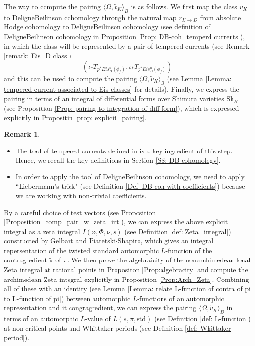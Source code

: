 \documentclass[11pt, a4paper]{amsart}
\theoremstyle{plain}
\theoremstyle{definition}
\newtheorem{remark}[theorem]{Remark}
\numberwithin{equation}{section}
\newcommand{\Sh}{\mathrm{Sh}}
\begin{document}
\par The way to compute the pairing $\langle \Omega, \tilde{v}_{K} \rangle_{B}$ is as follows. We first map the class $v_{K}$ to Deligne{\textendash}Beilinson cohomology through the natural map $r_{H \rightarrow D}$ from absolute Hodge cohomology to Deligne{\textendash}Beilinson cohomology (see definition of Deligne{\textendash}Beilinson cohomology in Proposition \ref{Prop: DB-coh_temperd currents}), in which the class will be represented by a pair of tempered currents (see Remark \ref{remark: Eis_D class})
\begin{equation*}
    (\iota_{*}T_{p^{*}Eis_{H}^{n}(\phi_f)}, \iota_{*} T_{p^{*}Eis_{B}^{n}(\phi_f)})
\end{equation*}
and this can be used to compute the pairing $\langle \Omega, \tilde{v}_{K} \rangle_{B}$ (see Lemma \ref{Lemma: tempered current associated to Eis classes} for details). Finally, we express the pairing in terms of an integral of differential forms over Shimura varieties $\Sh_{H}$ (see Proposition \ref{Prop: pairing to integration of diff form}), which is expressed explicitly in Propositin \ref{prop: explicit_pairing}. 

\begin{remark}
    \begin{itemize}
        \item The tool of tempered currents defined in \cite{BCLRJ24} is a key ingredient of this step. Hence, we recall the key definitions in Section \ref{SS: DB cohomology}. 
        \item In order to apply the tool of Deligne{\textendash}Beilinson cohomology, we need to apply ``Liebermann’s trick" (see Definition \ref{Def: DB-coh with coefficients}) because we are working with non-trivial coefficients. 
    \end{itemize}
\end{remark}

\par By a careful choice of test vectors (see Proposition \ref{Proposition_comp_pair_w_zeta_int}), we can express the above explicit integral as a zeta integral $I(\varphi, \Phi, \nu, s)$ (see Definition \ref{def: Zeta_integral}) constructed by Gelbart and Piatetski-Shapiro, which gives an integral repersentation of the twisted standard automorphic $L$-function of the contragredient $\tilde{\pi}$ of $\pi$. We then prove the algebraicity of the nonarchimedean local Zeta integral at rational points in Propositon \ref{Prop:algebracity} and compute the archimedean Zeta integral explicitly in Proposition \ref{Prop:Arch_Zeta}. Combining all of these with an identity (see Lemma \ref{Lemma: relate L-function of contra of pi to L-function of pi}) between automorphic $L$-functions of an automorphic representation and it congragredient, we can express the pairing $\langle \Omega, \tilde{v}_{K} \rangle_{B}$ in terms of an automorphic $L$-value of $L(s, \pi, \mathrm{std})$ (see Definition \ref{def: L-function}) at non-critical points and Whittaker periods (see Definition \ref{def: Whittaker period}).  
\end{document}
